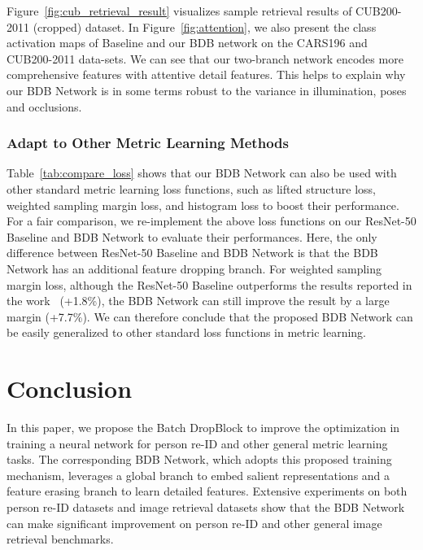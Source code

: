 \documentclass[10pt,twocolumn,letterpaper]{article}
\begin{document}
Figure~\ref{fig:cub_retrieval_result} visualizes sample retrieval results of CUB200-2011 (cropped) dataset.
In Figure~\ref{fig:attention}, we also present the class activation maps of Baseline and our BDB network on the CARS196 and CUB200-2011 data-sets.
We can see that our two-branch network encodes more comprehensive features with attentive detail features.
This helps to explain why our BDB Network is in some terms robust to the variance in illumination, poses and occlusions.
\vspace{-3mm}
\subsubsection{Adapt to Other Metric Learning Methods}\vspace{-1mm}
Table~\ref{tab:compare_loss} shows that our BDB Network can also be used with other standard metric learning loss functions, such as lifted structure loss\cite{oh2016deep}, weighted sampling margin loss\cite{wu2017sampling}, and histogram loss\cite{ustinova2016histogram} to boost their performance. 
For a fair comparison, we re-implement the above loss functions on our ResNet-50 Baseline and BDB Network to evaluate their performances. 
Here, the only difference between ResNet-50 Baseline and BDB Network is that the BDB Network has an additional feature dropping branch.
For weighted sampling margin loss, although the ResNet-50 Baseline outperforms the results reported in the work~\cite{wu2017sampling} (+1.8\%), the BDB Network can still improve the result by a large margin (+7.7\%).
We can therefore conclude that the proposed BDB Network can be easily generalized to other standard loss functions in metric learning.  
\section{Conclusion}
In this paper, we propose the Batch DropBlock to improve the optimization in training a neural network for person re-ID and other general metric learning tasks. 
The corresponding BDB Network, which adopts this proposed training mechanism, leverages a global branch to embed salient representations and a feature erasing branch to learn detailed features.
Extensive experiments on both person re-ID datasets and image retrieval datasets show that the BDB Network can make significant improvement on person re-ID and other general image retrieval benchmarks. 
{\small


}
\end{document}
